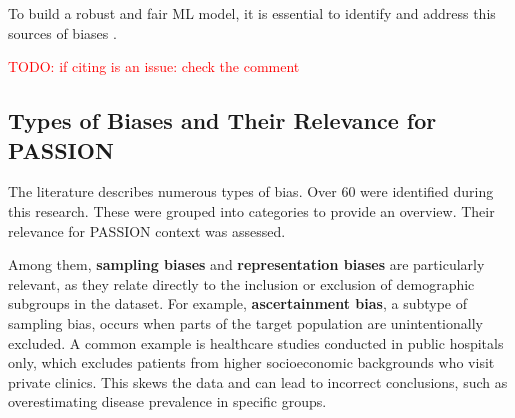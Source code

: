 \documentclass[12pt, a4paper, oneside]{book}   	%
\renewcommand{\todo}[1]{\textcolor{red}{TODO: #1}}
\begin{document}
		
		To build a robust and fair \gls{ML} model, it is essential to identify and address this sources of biases \autocite{Mehrabi2022}.
		
		\todo{if citing is an issue: check the comment}

		
		\subsection{Types of Biases and Their Relevance for PASSION}
		The literature describes numerous types of bias. Over 60 were identified during this research. These were grouped into categories to provide an overview. Their relevance for PASSION context was assessed.
		
		Among them, \textbf{sampling biases} and \textbf{representation biases} are particularly relevant, as they relate directly to the inclusion or exclusion of demographic subgroups in the dataset. For example, \textbf{ascertainment bias}, a subtype of sampling bias, occurs when parts of the target population are unintentionally excluded. A common example is healthcare studies conducted in public hospitals only, which excludes patients from higher socioeconomic backgrounds who visit private clinics. This skews the data and can lead to incorrect conclusions, such as overestimating disease prevalence in specific groups.
		
\end{document}
